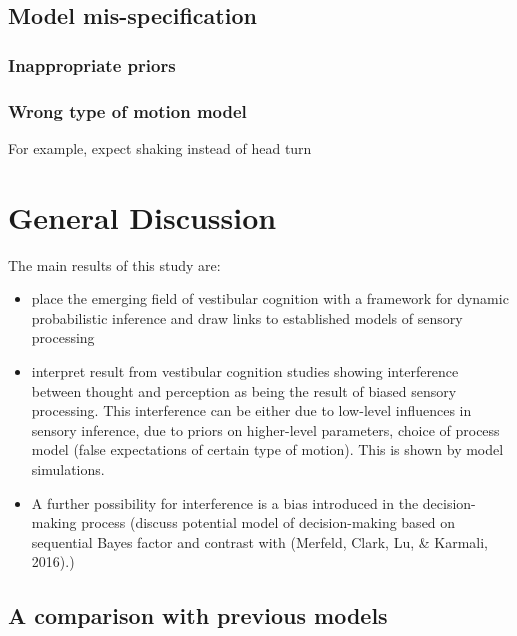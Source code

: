 \documentclass[english,floatsintext,man]{apa6}
\theoremstyle{definition}
\theoremstyle{definition}
\theoremstyle{remark}
\begin{document}
\subsection{Model mis-specification}\label{model-mis-specification}

\subsubsection{Inappropriate priors}\label{inappropriate-priors}

\subsubsection{Wrong type of motion
model}\label{wrong-type-of-motion-model}

For example, expect shaking instead of head turn

\section{General Discussion}\label{general-discussion}

The main results of this study are:

\begin{itemize}
\item
  place the emerging field of vestibular cognition with a framework for
  dynamic probabilistic inference and draw links to established models
  of sensory processing
\item
  interpret result from vestibular cognition studies showing
  interference between thought and perception as being the result of
  biased sensory processing. This interference can be either due to
  low-level influences in sensory inference, due to priors on
  higher-level parameters, choice of process model (false expectations
  of certain type of motion). This is shown by model simulations.
\item
  A further possibility for interference is a bias introduced in the
  decision-making process (discuss potential model of decision-making
  based on sequential Bayes factor and contrast with (Merfeld, Clark,
  Lu, \& Karmali, 2016).)
\end{itemize}

\subsection{A comparison with previous
models}\label{a-comparison-with-previous-models}
\end{document}
